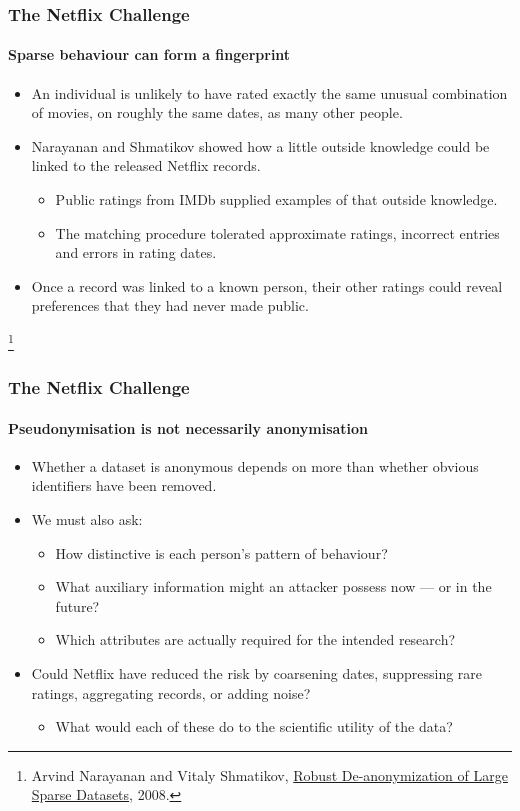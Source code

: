\documentclass[]{article}
\newcommand\blfootnote[1]{%
  \begingroup
  \renewcommand\thefootnote{}\footnote{#1}%
  \addtocounter{footnote}{-1}%
  \endgroup
}
\begin{document}
\begin{frame}
\frametitle{The Netflix Challenge}
\framesubtitle{Sparse behaviour can form a fingerprint}
\begin{itemize}
	\item<+-> An individual is unlikely to have rated exactly the same unusual combination of movies, on roughly the same dates, as many other people.
	\item<+-> Narayanan and Shmatikov showed how a little outside knowledge could be linked to the released Netflix records.
	\begin{itemize}
		\item Public ratings from IMDb supplied examples of that outside knowledge.
		\item The matching procedure tolerated approximate ratings, incorrect entries and errors in rating dates.
	\end{itemize}
	\item<+-> Once a record was linked to a known person, their other ratings could reveal preferences that they had never made public.
\end{itemize}
\blfootnote{\tiny Arvind Narayanan and Vitaly Shmatikov, \href{https://www.cs.cornell.edu/~shmat/shmat_oak08netflix.pdf}{Robust De-anonymization of Large Sparse Datasets}, 2008.}
\end{frame}

\begin{frame}
\frametitle{The Netflix Challenge}
\framesubtitle{Pseudonymisation is not necessarily anonymisation}
\begin{itemize}
	\item<+-> Whether a dataset is anonymous depends on more than whether obvious identifiers have been removed.
	\item<+-> We must also ask:
	\begin{itemize}
		\item How distinctive is each person's pattern of behaviour?
		\item What auxiliary information might an attacker possess now --- or in the future?
		\item Which attributes are actually required for the intended research?
	\end{itemize}
	\item<+-> Could Netflix have reduced the risk by coarsening dates, suppressing rare ratings, aggregating records, or adding noise?
	\begin{itemize}
		\item What would each of these do to the scientific utility of the data?
	\end{itemize}
\end{itemize}
\end{frame}
\end{document}
